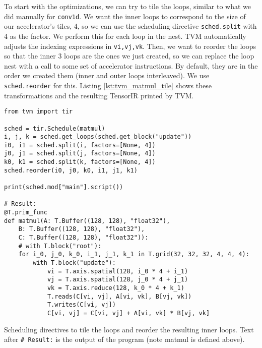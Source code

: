 \documentclass[acmsmall, nonacm=true]{acmart}
\begin{document}
To start with the optimizations, we can try to tile the loops, similar to what we did manually for \verb|conv1d|. We want the inner loops to correspond to the size of our accelerator's tiles, 4, so we can use the scheduling directive \verb|sched.split| with 4 as the factor. We perform this for each loop in the nest. TVM automatically adjusts the indexing expressions in \verb|vi,vj,vk|. Then, we want to reorder the loops so that the inner 3 loops are the ones we just created, so we can replace the loop nest with a call to some set of accelerator instructions. By default, they are in the order we created them (inner and outer loops interleaved). We use \verb|sched.reorder| for this. Listing \ref{lst:tvm_matmul_tile} shows these transformations and the resulting TensorIR printed by TVM.
\begin{listing}
    \centering
    \begin{verbatim}
from tvm import tir

sched = tir.Schedule(matmul)
i, j, k = sched.get_loops(sched.get_block("update"))
i0, i1 = sched.split(i, factors=[None, 4])
j0, j1 = sched.split(j, factors=[None, 4])
k0, k1 = sched.split(k, factors=[None, 4])
sched.reorder(i0, j0, k0, i1, j1, k1)

print(sched.mod["main"].script())

# Result: 
@T.prim_func
def matmul(A: T.Buffer((128, 128), "float32"),
    B: T.Buffer((128, 128), "float32"),
    C: T.Buffer((128, 128), "float32")):
    # with T.block("root"):
    for i_0, j_0, k_0, i_1, j_1, k_1 in T.grid(32, 32, 32, 4, 4, 4):
        with T.block("update"):
            vi = T.axis.spatial(128, i_0 * 4 + i_1)
            vj = T.axis.spatial(128, j_0 * 4 + j_1)
            vk = T.axis.reduce(128, k_0 * 4 + k_1)
            T.reads(C[vi, vj], A[vi, vk], B[vj, vk])
            T.writes(C[vi, vj])
            C[vi, vj] = C[vi, vj] + A[vi, vk] * B[vj, vk]
\end{verbatim}
\caption{Scheduling directives to tile the loops and reorder the resulting inner loops. Text after \texttt{\# Result:} is the output of the program (note matmul is defined above).}
\label{lst:tvm_matmul_tile}
\end{listing}
\end{document}
